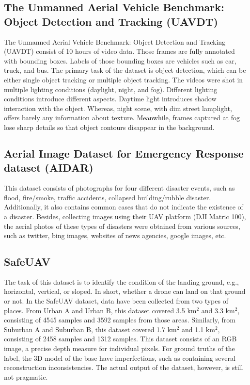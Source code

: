 \subsection{The Unmanned Aerial Vehicle Benchmark: Object Detection and Tracking (UAVDT)}
The Unmanned Aerial Vehicle Benchmark: Object Detection and Tracking (UAVDT) consist of 10 hours of video data. Those frames are fully annotated with bounding boxes. Labels of those bounding boxes are vehicles such as car, truck, and bus. The primary task of the dataset is object detection, which can be either single object tracking or multiple object tracking.  The videos were shot in multiple lighting conditions (daylight, night, and fog). Different lighting conditions introduce different aspects. Daytime light introduces shadow interaction with the object. Whereas, night scene, with dim street lamplight, offers barely any information about texture. Meanwhile, frames captured at fog lose sharp details so that object contours disappear in the background.

\subsection{Aerial Image Dataset for Emergency Response dataset (AIDAR)}

This dataset consists of photographs for four different disaster events, such as flood, fire/smoke, traffic accidents, collapsed building/rubble disaster. Additionally, it also contains common cases that do not indicate the existence of a disaster. Besides, collecting images using their UAV platform (DJI Matric 100), the aerial photos of these types of disasters were obtained from various sources, such as twitter, bing images, websites of news agencies, google images, etc.

\subsection{SafeUAV}

The task of this dataset is to identify the condition of the landing ground, e.g., horizontal, vertical, or sloped. In short, whether a drone can land on that ground or not. In the SafeUAV dataset, data have been collected from two types of places. From Urban A and Urban B, this dataset covered 3.5 km$^2$ and 3.3 km$^2$, consisting of 4545 samples and 3592 samples from those areas. Similarly, from Suburban A and Suburban B, this dataset covered 1.7 km$^2$ and 1.1 km$^2$, consisting of 2458 samples and 1312 samples. This dataset consists of an RGB image, a precise depth measure for individual pixels. For ground truths of the label, the 3D model of the base have imperfections, such as containing several reconstruction inconsistencies. The actual output of the dataset, however, is still not pragmatic.

